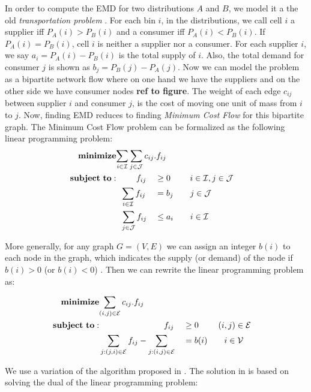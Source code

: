 In order to compute the EMD for two distributions $A$ and $B$, we model it a the old \textit{transportation problem} \cite{Dantzig51}. For each bin $i$, in the distributions, we call cell $i$ a supplier iff $P_A(i) > P_B(i)$ and a consumer iff $P_A(i) < P_B(i)$. If $P_A(i) = P_B(i)$, cell $i$ is neither a supplier nor a consumer. For each supplier $i$, we say $a_i = P_A(i) - P_B(i)$ is the total supply of $i$. Also, the total demand for consumer $j$ is shown as $b_j = P_B(j) - P_A(j)$. Now we can model the problem as a bipartite network flow where on one hand we have the suppliers and on the other side we have consumer nodes \textbf{ref to figure}. The weight of each edge $c_{ij}$ between supplier $i$ and consumer $j$, is the cost of moving one unit of mass from $i$ to $j$.  Now, finding EMD reduces to finding \textit{Minimum Cost Flow} for this bipartite graph. The Minimum Cost Flow problem can be formalized as the following linear programming problem:\\

\setcounter{equation}{0}
\begin{alignat}{2}
\mathbf{minimize}&\mathrlap{\sum_{i \in \mathcal{I}} \sum_{j \in \mathcal{J}} c_{ij}.f_{ij}} \notag\\
\mathbf{subject\ to:}&\phantom{{a}={a}} f_{ij} && \geq 0 \ \quad\quad i \in \mathcal{I}, j \in \mathcal{J}\\
&\phantom{{a}}\sum_{i \in \mathcal{I}} f_{ij} &&= b_j \quad\quad j \in \mathcal{J}\\
&\phantom{{a}}\sum_{j \in \mathcal{J}} f_{ij} &&\leq a_i \quad\quad i \in \mathcal{I}
\end{alignat}

More generally, for any graph $G = (V, E)$ we can assign an integer $b(i)$ to each node in the graph, which indicates the supply (or demand) of the node if $b(i) > 0$ (or $b(i) < 0$) . Then we can rewrite the linear programming problem as: 

\setcounter{equation}{0}
\begin{alignat}{2}
\mathbf{minimize}&\mathrlap{\sum_{(i,j) \in \mathcal{E}} c_{ij}.f_{ij}} \notag\\
\mathbf{subject\ to:}&\phantom{{a}={a}{a}={a}{a}={a}{a}} f_{ij} && \geq 0 \ \quad\quad (i,j) \in \mathcal{E}\\
&\sum_{j:(j,i) \in \mathcal{E}} f_{ij} - \sum_{j:(i,j) \in \mathcal{E}} &&= b(i) \quad\quad i \in \mathcal{V}
\end{alignat}

We use a variation of the algorithm proposed in \cite{Edmonds72}. The solution in \cite{Edmonds72} is based on solving the dual of the linear programming problem:

